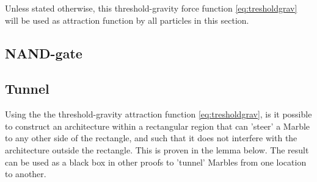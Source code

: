 Unless stated otherwise, this threshold-gravity force function \eqref{eq:tresholdgrav} will be used as attraction function by all particles in this section.

\subsection{NAND-gate}


\subsection{Tunnel}

Using the the threshold-gravity attraction function \eqref{eq:tresholdgrav}, is it possible to construct an architecture within a rectangular region that can 'steer' a Marble to any other side of the rectangle, and such that it does not interfere with the architecture outside the rectangle. This is proven in the lemma below. The result can be used as a black box in other proofs to 'tunnel' Marbles from one location to another.

